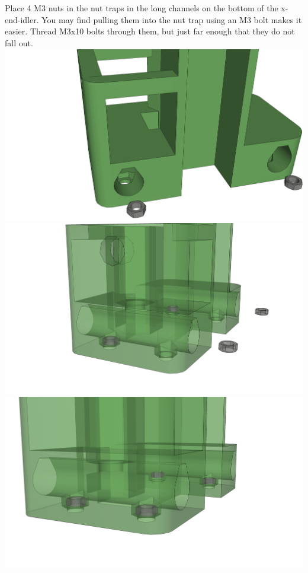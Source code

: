 \documentclass[twoside,a4paper,titlepage]{memoir}
\begin{document}
	\section{}
	Place 4 M3 nuts in the nut traps in the long channels on the bottom of the x-end-idler. You may find
	pulling them into the nut trap using an M3 bolt makes it easier. Thread M3x10 bolts through them, but
	just far enough that they do not fall out.\\
	\includegraphics[width=1\linewidth]{graphics/ch7_3_1.png}
	\includegraphics[width=1\linewidth]{graphics/ch7_3_2.png}
	\includegraphics[width=1\linewidth]{graphics/ch7_3_3.png}
\end{document}
